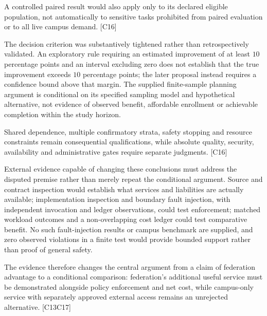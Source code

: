 \documentclass[11pt]{article}
\begin{document}
A controlled paired result would also apply only to its declared eligible population, not automatically to sensitive tasks prohibited from paired evaluation or to all live campus demand. [C16]

The decision criterion was substantively tightened rather than retrospectively validated. An exploratory rule requiring an estimated improvement of at least $10$ percentage points and an interval excluding zero does not establish that the true improvement exceeds $10$ percentage points; the later proposal instead requires a confidence bound above that margin. The supplied finite-sample planning argument is conditional on its specified sampling model and hypothetical alternative, not evidence of observed benefit, affordable enrollment or achievable completion within the study horizon.

Shared dependence, multiple confirmatory strata, safety stopping and resource constraints remain consequential qualifications, while absolute quality, security, availability and administrative gates require separate judgments. [C16]

External evidence capable of changing these conclusions must address the disputed premise rather than merely repeat the conditional argument. Source and contract inspection would establish what services and liabilities are actually available; implementation inspection and boundary fault injection, with independent invocation and ledger observations, could test enforcement; matched workload outcomes and a non-overlapping cost ledger could test comparative benefit. No such fault-injection results or campus benchmark are supplied, and zero observed violations in a finite test would provide bounded support rather than proof of general safety.

The evidence therefore changes the central argument from a claim of federation advantage to a conditional comparison: federation's additional useful service must be demonstrated alongside policy enforcement and net cost, while campus-only service with separately approved external access remains an unrejected alternative. [C13\textendash{}C17]
\end{document}
